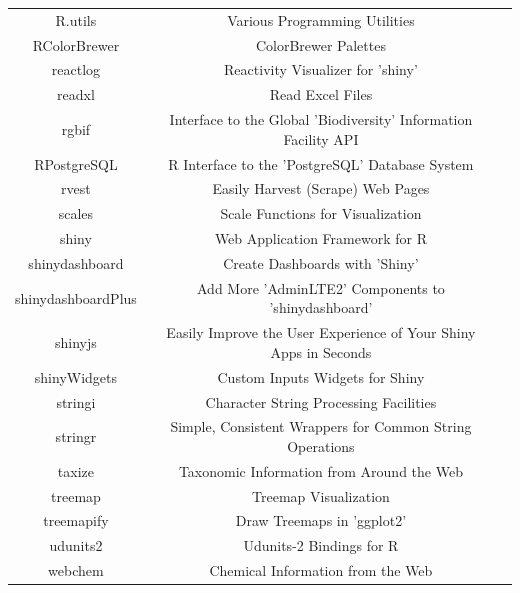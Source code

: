 \documentclass[journal,datadescriptor,submit,moreauthors,pdftex]{Definitions/mdpi}
\begin{document}
\begin{table}[H]
\begin{tabular}{ccc}
R.utils & Various Programming Utilities & \citep{R-R.utils} \\
RColorBrewer & ColorBrewer Palettes & \citep{R-RColorBrewer} \\
reactlog & Reactivity Visualizer for 'shiny' & \citep{R-reactlog} \\
readxl & Read Excel Files & \citep{R-readxl} \\
rgbif & Interface to the Global 'Biodiversity' Information Facility API & \citep{R-rgbif} \\ RPostgreSQL & R Interface to the 'PostgreSQL' Database System & \citep{R-RPostgreSQL} \\
rvest & Easily Harvest (Scrape) Web Pages & \citep{R-rvest} \\
scales & Scale Functions for Visualization & \citep{R-scales} \\
shiny & Web Application Framework for R & \citep{R-shiny} \\
shinydashboard & Create Dashboards with 'Shiny' & \citep{R-shinydashboard} \\
shinydashboardPlus & Add More 'AdminLTE2' Components to 'shinydashboard' & \citep{R-shinydashboardPlus} \\
shinyjs & Easily Improve the User Experience of Your Shiny Apps in Seconds & \citep{R-shinyjs} \\ shinyWidgets & Custom Inputs Widgets for Shiny & \citep{R-shinyWidgets} \\
stringi & Character String Processing Facilities & \citep{R-stringi} \\
stringr & Simple, Consistent Wrappers for Common String Operations & \citep{R-stringr} \\
taxize & Taxonomic Information from Around the Web & \citep{R-taxize} \\
treemap & Treemap Visualization & \citep{R-treemap} \\
treemapify & Draw Treemaps in 'ggplot2' & \citep{R-treemapify} \\
udunits2 & Udunits-2 Bindings for R & \citep{R-udunits2} \\
webchem & Chemical Information from the Web & \citep{R-webchem} \\
\bottomrule
\end{tabular}
\end{table}

\end{document}
